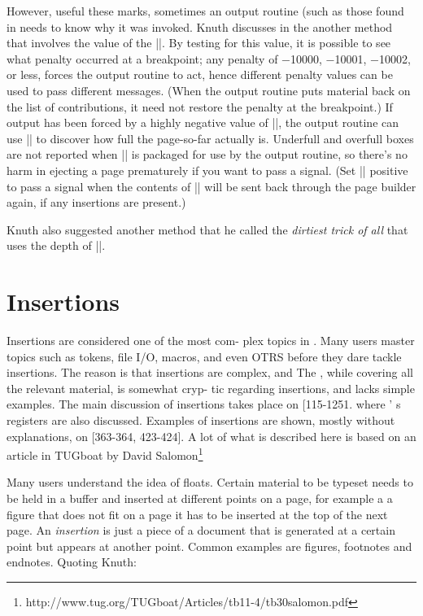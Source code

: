 However, useful these marks, sometimes an output routine (such as those found in \latexe needs to know why it was invoked. Knuth discusses in the   another method
that involves the value of the |\outputpenalty|. 
By testing for this value, it is possible to see what penalty occurred at a breakpoint;
any penalty of −10000, −10001, −10002, or less, forces the output routine to
act, hence different penalty values can be used to pass different messages. (When
the output routine puts material back on the list of contributions, it need not restore
the penalty at the breakpoint.) If output has been forced by a highly negative value
of |\outputpenalty|, the output routine can use |\vbox{}| to discover how
full the page-so-far actually is. Underfull and overfull boxes are not reported when
|| is packaged for use by the output routine, so there’s no harm in ejecting a
page prematurely if you want to pass a signal. (Set |\holdinginserts| positive to pass
a signal when the contents of || will be sent back through the page builder again,
if any insertions are present.)

Knuth also suggested another method that he called the \emph{dirtiest trick of all} that uses the depth 
of ||. 

\section{Insertions}
Insertions are considered one of  the most  com- 
plex  topics in \tex. Many users master  topics  such 
as tokens,  file  I/O, macros,  and  even  OTRS  before 
they dare  tackle  insertions.  The  reason  is  that 
insertions  are  complex,  and  The \texbook, while 
covering all the relevant material, is somewhat cryp- 
tic regarding  insertions, and  lacks  simple examples. 
The  main  discussion  of  insertions takes  place  on 
[115-1251.  where \tex' s  registers  are also discussed. 
Examples  of  insertions are  shown, mostly  without 
explanations,  on  [363-364,  423-424].  A lot of what is described here is based on an article in TUGboat by David Salomon\footnote{ 
http://www.tug.org/TUGboat/Articles/tb11-4/tb30salomon.pdf}

Many users understand the idea of floats. Certain material to be typeset needs to be held in a buffer and inserted at different points on a page, for example a a figure that does not fit on a page it has to be inserted at the top of the next page. An \textit{insertion} is just a piece of a document that is generated at a certain point but appears at another point. Common examples are figures, footnotes and endnotes. Quoting Knuth:


